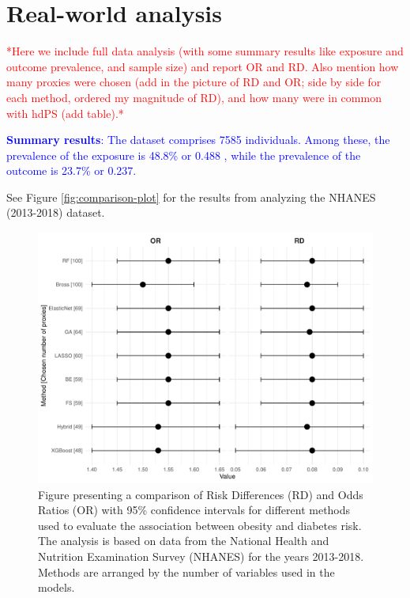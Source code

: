 \documentclass[sn-vancouver,Numbered,lineno,pdflatex]{sn-jnl}
\begin{document}
\section{Real-world analysis}\label{real-world-analysis}

\textcolor{red}{*Here we include full data analysis (with some summary results like exposure and outcome prevalence, and sample size) and report OR and RD. Also mention how many proxies were chosen (add in the picture of RD and OR; side by side for each method, ordered my magnitude of RD), and how many were in common with hdPS (add table).*}

\textcolor{blue}{\textbf{Summary results}: The dataset comprises 7585 individuals. Among these, the prevalence of the exposure is 48.8\% or 0.488 , while the prevalence of the outcome is 23.7\% or 0.237.}

See Figure \ref{fig:comparison-plot} for the results from analyzing the
NHANES (2013-2018) dataset.

\begin{figure}[th]

{\centering \includegraphics[width=1\linewidth,]{manuscript_files/figure-latex/unnamed-chunk-3-1} 

}

\caption{Figure presenting a comparison of Risk Differences (RD) and Odds Ratios (OR) with 95\% confidence intervals for different methods used to evaluate the association between obesity and diabetes risk. The analysis is based on data from the National Health and Nutrition Examination Survey (NHANES) for the years 2013-2018. Methods are arranged by the number of variables used in the models.\label{fig:comparison-plot}}\label{fig:unnamed-chunk-3}
\end{figure}
\end{document}
